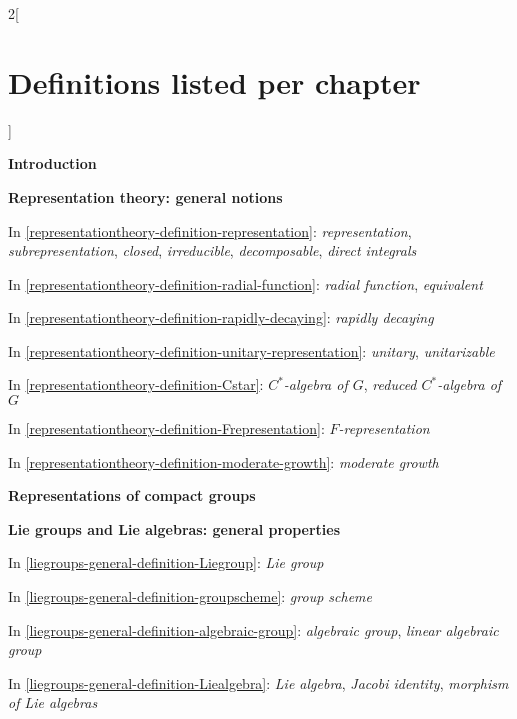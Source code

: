 \begin{multicols}{2}[\section{Definitions listed per chapter}\label{section-per-chapter}]

\medskip\noindent
{\bf Introduction}

\medskip

\medskip\noindent
{\bf Representation theory: general notions}

\medskip

\noindent
In \ref{representationtheory-definition-representation}: 
{\it representation},
{\it subrepresentation},
{\it closed},
{\it irreducible},
{\it decomposable},
{\it direct integrals}


\noindent
In \ref{representationtheory-definition-radial-function}: 
{\it radial function},
{\it equivalent}


\noindent
In \ref{representationtheory-definition-rapidly-decaying}: 
{\it rapidly decaying}


\noindent
In \ref{representationtheory-definition-unitary-representation}: 
{\it unitary},
{\it unitarizable}


\noindent
In \ref{representationtheory-definition-Cstar}: 
{\it $C^*$-algebra of $G$},
{\it reduced $C^*$-algebra of $G$}


\noindent
In \ref{representationtheory-definition-Frepresentation}: 
{\it $F$-representation}


\noindent
In \ref{representationtheory-definition-moderate-growth}: 
{\it moderate growth}


\medskip\noindent
{\bf Representations of compact groups}

\medskip

\medskip\noindent
{\bf Lie groups and Lie algebras: general properties}

\medskip

\noindent
In \ref{liegroups-general-definition-Liegroup}: 
{\it Lie group}


\noindent
In \ref{liegroups-general-definition-groupscheme}: 
{\it group scheme}


\noindent
In \ref{liegroups-general-definition-algebraic-group}: 
{\it algebraic group},
{\it linear algebraic group}


\noindent
In \ref{liegroups-general-definition-Liealgebra}: 
{\it Lie algebra},
{\it Jacobi identity},
{\it morphism of Lie algebras}



\end{multicols}
